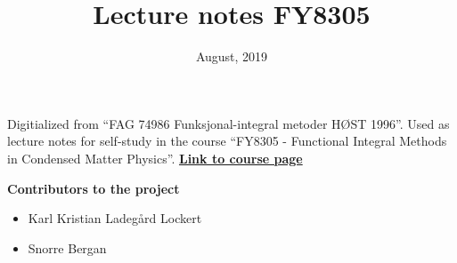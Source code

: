 \documentclass{article}
\title{Lecture notes FY8305}
\date{August, 2019}
\theoremstyle{definition}
\newcommand{\contribs}{%
\begin{center}
\Large 
\textbf{Contributors to the project}
\end{center}


\begin{itemize}
\item Karl Kristian Ladegård Lockert
\item Snorre Bergan
\end{itemize}

}
\begin{document}
\maketitle
Digitialized from ``FAG 74986 Funksjonal-integral metoder HØST 1996''.
Used as lecture notes for self-study in the course ``FY8305 - Functional Integral Methods in Condensed Matter Physics''. \href{https://www.ntnu.edu/studies/courses/FY8305}{\textbf{Link to course page}}
\contribs
\tableofcontents






















%
%
%
%
%
%
%
%
\end{document}
